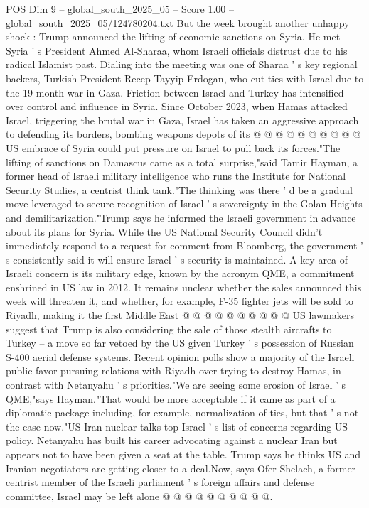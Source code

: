 \begin{textsample}{POS Dim 9 – global\_south\_2025\_05 – Score 1.00 – global\_south\_2025\_05/124780204.txt}
But the week brought another unhappy shock : Trump announced the lifting of economic sanctions on Syria.
He met Syria ' s President Ahmed Al-Sharaa, whom Israeli officials distrust due to his radical Islamist past.
Dialing into the meeting was one of Sharaa ' s key regional backers, Turkish President Recep Tayyip Erdogan, who cut ties with Israel due to the 19-month war in Gaza.
Friction between Israel and Turkey has intensified over control and influence in Syria.
Since October 2023, when Hamas attacked Israel, triggering the brutal war in Gaza, Israel has taken an aggressive approach to defending its borders, bombing weapons depots of its @ @ @ @ @ @ @ @ @ @ US embrace of Syria could put pressure on Israel to pull back its forces."The lifting of sanctions on Damascus came as a total surprise,"said Tamir Hayman, a former head of Israeli military intelligence who runs the Institute for National Security Studies, a centrist think tank."The thinking was there ' d be a gradual move leveraged to secure recognition of Israel ' s sovereignty in the Golan Heights and demilitarization."Trump says he informed the Israeli government in advance about its plans for Syria.
While the US National Security Council didn't immediately respond to a request for comment from Bloomberg, the government ' s consistently said it will ensure Israel ' s security is maintained.
A key area of Israeli concern is its military edge, known by the acronym QME, a commitment enshrined in US law in 2012.
It remains unclear whether the sales announced this week will threaten it, and whether, for example, F-35 fighter jets will be sold to Riyadh, making it the first Middle East @ @ @ @ @ @ @ @ @ @ US lawmakers suggest that Trump is also considering the sale of those stealth aircrafts to Turkey -- a move so far vetoed by the US given Turkey ' s possession of Russian S-400 aerial defense systems.
Recent opinion polls show a majority of the Israeli public favor pursuing relations with Riyadh over trying to destroy Hamas, in contrast with Netanyahu ' s priorities."We are seeing some erosion of Israel ' s QME,"says Hayman."That would be more acceptable if it came as part of a diplomatic package including, for example, normalization of ties, but that ' s not the case now."US-Iran nuclear talks top Israel ' s list of concerns regarding US policy.
Netanyahu has built his career advocating against a nuclear Iran but appears not to have been given a seat at the table.
Trump says he thinks US and Iranian negotiators are getting closer to a deal.Now, says Ofer Shelach, a former centrist member of the Israeli parliament ' s foreign affairs and defense committee, Israel may be left alone @ @ @ @ @ @ @ @ @ @.

\end{textsample}

